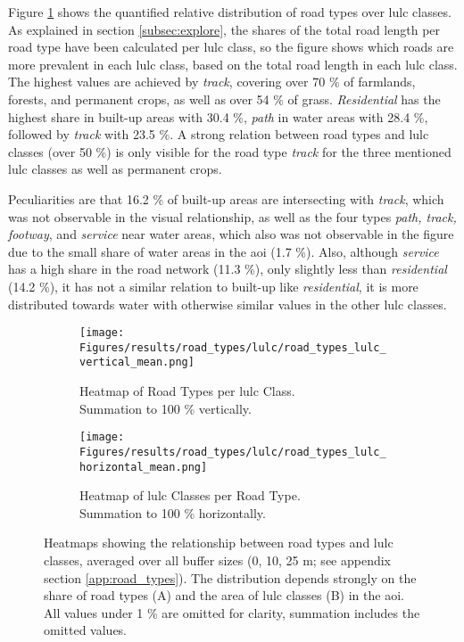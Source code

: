Figure \ref{fig:types_v_mean} shows the quantified relative distribution of road types over \gls{lulc} classes. As explained in section \ref{subsec:explore}, the shares of the total road length per road type have been calculated per \gls{lulc} class, so the figure shows which roads are more prevalent in each \gls{lulc} class, based on the total road length in each \gls{lulc} class. The highest values are achieved by \emph{track}, covering over 70 \% of farmlands, forests, and permanent crops, as well as over 54 \% of grass. \emph{Residential} has the highest share in built-up areas with 30.4 \%, \emph{path} in water areas with 28.4 \%, followed by \emph{track} with 23.5 \%. A strong relation between road types and \gls{lulc} classes (over 50 \%) is only visible for the road type \emph{track} for the three mentioned \gls{lulc} classes as well as permanent crops.  

Peculiarities are that 16.2 \% of built-up areas are intersecting with \emph{track}, which was not observable in the visual relationship, as well as the four types \emph{path, track, footway}, and \emph{service} near water areas, which also was not observable in the figure due to the small share of water areas in the \gls{aoi} (1.7 \%). Also, although \emph{service} has a high share in the road network (11.3 \%), only slightly less than \emph{residential} (14.2 \%), it has not a similar relation to built-up like \emph{residential}, it is more distributed towards water with otherwise similar values in the other \gls{lulc} classes.

\begin{figure}[htb]
    \centering
    \begin{subfigure}{0.4625\textwidth}
        \centering
        \texttt{[image: Figures/results/road\_types/lulc/road\_types\_lulc\_vertical\_mean.png]}
        \caption{Heatmap of Road Types per \gls{lulc} Class.\\Summation to 100 \% vertically.}
        \label{fig:types_v_mean}
    \end{subfigure}
    \begin{subfigure}{0.5275\textwidth}
        \centering
        \texttt{[image: Figures/results/road\_types/lulc/road\_types\_lulc\_horizontal\_mean.png]}
        \caption{Heatmap of \gls{lulc} Classes per Road Type.\\Summation to 100 \% horizontally.}
        \label{fig:types_h_mean}
    \end{subfigure}
    \caption[Averaged Heatmaps of Road Types vs.  Classes]{Heatmaps showing the relationship between road types and \gls{lulc} classes, averaged over all buffer sizes (0, 10, 25 m; see appendix section \ref{app:road_types}). The distribution depends strongly on the share of road types (A) and the area of \gls{lulc} classes (B) in the \gls{aoi}. All values under 1 \% are omitted for clarity, summation includes the omitted values.}
    \label{fig:types_mean}
\end{figure}

